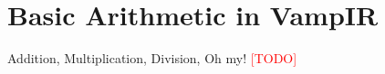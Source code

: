 \section{Basic Arithmetic in VampIR}

Addition, Multiplication, Division, Oh my! \textcolor{red}{[TODO]}